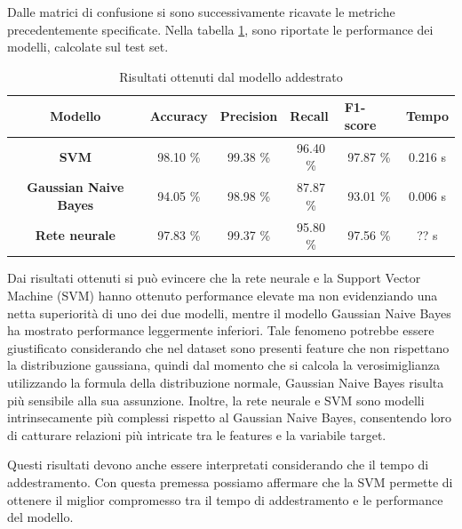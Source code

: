 Dalle matrici di confusione si sono successivamente ricavate le metriche
precedentemente specificate. Nella tabella \ref{tab:risultati}, sono riportate
le performance dei modelli, calcolate sul test set.
\begin{table}[!ht]
    \centering
    \begin{tabular}{@{}clllll@{}}
        \toprule
        \rowcolor[HTML]{EFEFEF}
        \textbf{Modello}                                      & \textbf{Accuracy}            & \textbf{Precision}           & \textbf{Recall}              & \textbf{F1-score}            & \textbf{Tempo}              \\ \midrule
        \cellcolor[HTML]{EFEFEF}\textbf{SVM}                  & \multicolumn{1}{c}{98.10 \%} & \multicolumn{1}{c}{99.38 \%} & \multicolumn{1}{c}{96.40 \%} & \multicolumn{1}{c}{97.87 \%} & \multicolumn{1}{c}{0.216 s} \\
        \cellcolor[HTML]{EFEFEF}\textbf{Gaussian Naive Bayes} & \multicolumn{1}{c}{94.05 \%} & \multicolumn{1}{c}{98.98 \%} & \multicolumn{1}{c}{87.87 \%} & \multicolumn{1}{c}{93.01 \%} & \multicolumn{1}{c}{0.006 s} \\
        \cellcolor[HTML]{EFEFEF}\textbf{Rete neurale}         & \multicolumn{1}{c}{97.83 \%} & \multicolumn{1}{c}{99.37 \%} & \multicolumn{1}{c}{95.80 \%} & \multicolumn{1}{c}{97.56 \%} & \multicolumn{1}{c}{?? s}    \\ \bottomrule
    \end{tabular}
    \caption{Risultati ottenuti dal modello addestrato}
    \label{tab:risultati}
\end{table}

Dai risultati ottenuti si può evincere che la rete neurale e la Support Vector
Machine (SVM) hanno ottenuto performance elevate ma non evidenziando
una netta superiorità di uno dei due modelli, mentre il modello Gaussian
Naive Bayes ha mostrato performance leggermente inferiori. Tale fenomeno potrebbe
essere giustificato considerando che nel dataset sono presenti feature che non
rispettano la distribuzione gaussiana, quindi dal momento che si calcola la
verosimiglianza utilizzando la formula della distribuzione normale, Gaussian
Naive Bayes risulta più sensibile alla sua assunzione. Inoltre, la rete neurale
e SVM sono modelli intrinsecamente più complessi rispetto al Gaussian Naive
Bayes, consentendo loro di catturare relazioni più intricate tra le features e
la variabile target.

Questi risultati devono anche essere interpretati considerando che il tempo di
addestramento. Con questa premessa possiamo affermare che la SVM permette di
ottenere il miglior compromesso tra il tempo di addestramento e le performance
del modello.

